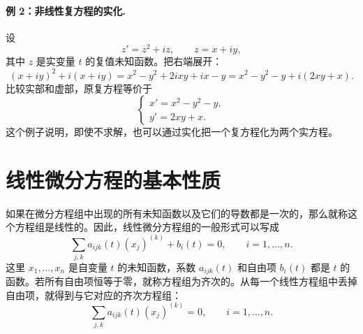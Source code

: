 \paragraph{例 2：非线性复方程的实化.}
设
\begin{equation}
 z'=z^2+iz,
 \qquad
 z=x+iy,
 \label{eq:ch1-nonlinear-complex-example}
\end{equation}
其中 \(z\) 是实变量 \(t\) 的复值未知函数。把右端展开：
\[
 (x+iy)^2+i(x+iy)
 =x^2-y^2+2ixy+ix-y
 =x^2-y^2-y+i(2xy+x).
\]
比较实部和虚部，原复方程等价于
\begin{equation}
 \begin{cases}
  x'=x^2-y^2-y,\\
  y'=2xy+x.
 \end{cases}
 \label{eq:ch1-nonlinear-complex-real-system}
\end{equation}
这个例子说明，即使不求解，也可以通过实化把一个复方程化为两个实方程。

\section{线性微分方程的基本性质}

如果在微分方程组中出现的所有未知函数以及它们的导数都是一次的，那么就称这个方程组是线性的。因此，线性微分方程组的一般形式可以写成
\begin{equation}
 \sum_{j,k}a_{ijk}(t)(x_j)^{(k)}+b_i(t)=0,
 \qquad i=1,\ldots,n.
 \label{eq:ch1-linear-general-components}
\end{equation}
这里 \(x_1,\ldots,x_n\) 是自变量 \(t\) 的未知函数，系数 \(a_{ijk}(t)\) 和自由项 \(b_i(t)\) 都是 \(t\) 的函数。若所有自由项恒等于零，就称方程组为齐次的。从每一个线性方程组中丢掉自由项，就得到与它对应的齐次方程组：
\begin{equation}
 \sum_{j,k}a_{ijk}(t)(x_j)^{(k)}=0,
 \qquad i=1,\ldots,n.
 \label{eq:ch1-linear-homogeneous-components}
\end{equation}

